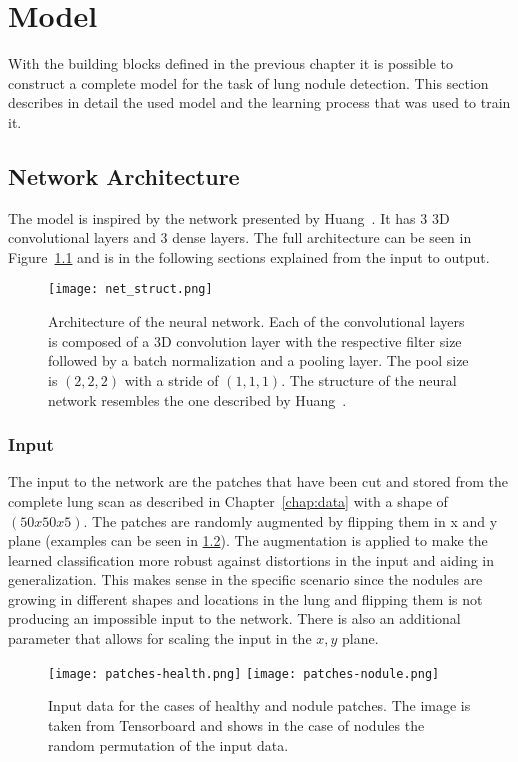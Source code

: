 \documentclass[main.tex]{subfiles}
\begin{document}
\chapter{Model}\label{chap:model}
With the building blocks defined in the previous chapter it is possible to construct a complete model for the task of lung nodule detection. This section describes in detail the used model and the learning process that was used to train it.

\section{Network Architecture}
The model is inspired by the network presented by Huang~\cite{huang2017lung}. It has $3$ 3D convolutional layers and $3$ dense layers. The full architecture can be seen in Figure~\ref{fig:net_struct} and is in the following sections explained from the input to output.

\begin{figure}
\begin{center}
\texttt{[image: net\_struct.png]}
\end{center}
\caption{Architecture of the neural network. Each of the convolutional layers is composed of a 3D convolution layer with the respective filter size followed by a batch normalization and a pooling layer. The pool size is $(2,2,2)$ with a stride of $(1,1,1)$. The structure of the neural network resembles the one described by Huang~\cite{huang2017lung}.}
\label{fig:net_struct}
\end{figure}

\subsection{Input} 
The input to the network are the patches that have been cut and stored from the complete lung scan as described in Chapter~\ref{chap:data} with a shape of $(50x50x5)$. The patches are randomly augmented by flipping them in x and y plane (examples can be seen in \ref{fig:input}). The augmentation is applied to make the learned classification more robust against distortions in the input and aiding in generalization. This makes sense in the specific scenario since the nodules are growing in different shapes and locations in the lung and flipping them is not producing an impossible input to the network. There is also an additional parameter that allows for scaling the input in the $x,y$ plane.

\begin{figure}
\begin{center}
\texttt{[image: patches-health.png]}
\texttt{[image: patches-nodule.png]}
\end{center}
\caption{Input data for the cases of healthy and nodule patches. The image is taken from Tensorboard and shows in the case of nodules the random permutation of the input data.}
\label{fig:input}
\end{figure}
\end{document}
